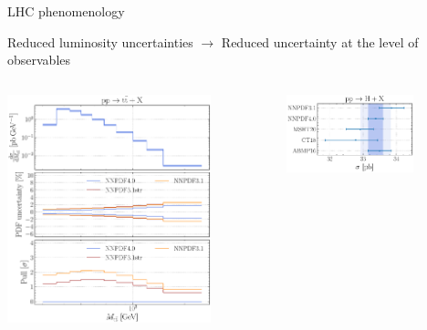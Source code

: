 \documentclass[aspectratio=169,9pt]{beamer}
\begin{document}
\begin{frame}[t]{LHC phenomenology}
    \begin{center}
        Reduced luminosity uncertainties $\rightarrow$ Reduced uncertainty at the level of observables\\
        \vspace*{-0.5em}
        \begin{columns}
            \begin{column}{0.48\textwidth}
                \begin{center}
                    \includegraphics[width=0.78\textwidth]{NNPDF_TTB_14TEV_40_PHENO-internal} 
                \end{center}
            \end{column}
            \begin{column}{0.48\textwidth}
                \includegraphics[width=0.7\textwidth]{NNPDF_H_14TEV_40_PHENO-integrated}\\

\end{column}
\end{columns}
\end{center}
\end{frame}
\end{document}
